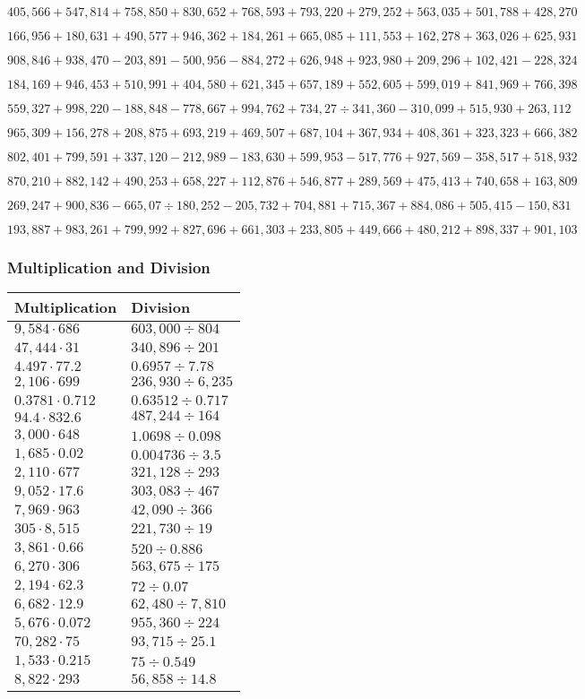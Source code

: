 \(405,566+547,814+758,850+830,652+768,593+793,220+279,252+563,035+501,788+ 428,270\)

\(166,956+180,631+490,577+946,362+184,261+665,085+111,553+162,278+363,026+625,931\)

\(908,846+938,470-203,891-500,956-884,272+626,948+923,980+209,296+102,421-228,324\)

\(184,169+946,453+510,991+404,580+621,345+657,189+552,605+599,019+841,969+766,398\)

\(559,327+998,220-188,848-778,667+994,762+734,27÷341,360-310,099+515,930+263,112\)

\(965,309+156,278+208,875+693,219+469,507+687,104+367,934+408,361+323,323+666,382\)

\(802,401+799,591+337,120-212,989-183,630+599,953-517,776+927,569-358,517+518,932\)

\(870,210+882,142+490,253+658,227+112,876+546,877+289,569+475,413+740,658+163,809\)

\(269,247+900,836-665,07÷180,252-205,732+704,881+715,367+884,086+505,415-150,831\)

\(193,887+983,261+799,992+827,696+661,303+233,805+449,666+480,212+898,337+901,103\)

\hypertarget{multiplication-and-division-346}{%
\subsubsection{Multiplication and
Division}\label{multiplication-and-division-346}}

\begin{longtable}[]{@{}ll@{}}
\toprule
Multiplication & Division\tabularnewline
\midrule
\endhead
\(9,584\cdot686\) & \(603,000÷804\)\tabularnewline
\(47,444\cdot31\) & \(340,896÷201\)\tabularnewline
\(4.497\cdot77.2\) & \(0.6957÷7.78\)\tabularnewline
\(2,106\cdot699\) & \(236,930÷6,235\)\tabularnewline
\(0.3781\cdot0.712\) & \(0.63512÷0.717\)\tabularnewline
\(94.4\cdot832.6\) & \(487,244÷164\)\tabularnewline
\(3,000\cdot648\) & \(1.0698÷0.098\)\tabularnewline
\(1,685\cdot0.02\) & \(0.004736÷3.5\)\tabularnewline
\(2,110\cdot677\) & \(321,128÷293\)\tabularnewline
\(9,052\cdot17.6\) & \(303,083÷467\)\tabularnewline
\(7,969\cdot963\) & \(42,090÷366\)\tabularnewline
\(305\cdot8,515\) & \(221,730÷19\)\tabularnewline
\(3,861\cdot0.66\) & \(520÷0.886\)\tabularnewline
\(6,270\cdot306\) & \(563,675÷175\)\tabularnewline
\(2,194\cdot62.3\) & \(72÷0.07\)\tabularnewline
\(6,682\cdot12.9\) & \(62,480÷7,810\)\tabularnewline
\(5,676\cdot0.072\) & \(955,360÷224\)\tabularnewline
\(70,282\cdot75\) & \(93,715÷25.1\)\tabularnewline
\(1,533\cdot0.215\) & \(75÷0.549\)\tabularnewline
\(8,822\cdot293\) & \(56,858÷14.8\)\tabularnewline
\bottomrule
\end{longtable}

